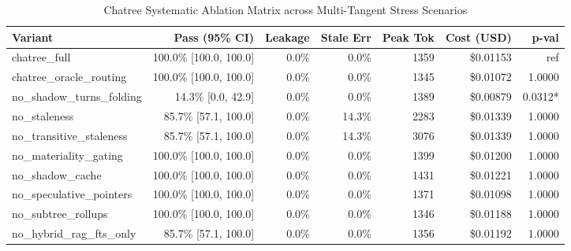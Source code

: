 \begin{table}[t]
\centering
\small
\begin{tabular}{lrrrrrr}
\toprule
\textbf{Variant} & \textbf{Pass (95\% CI)} & \textbf{Leakage} & \textbf{Stale Err} & \textbf{Peak Tok} & \textbf{Cost (USD)} & \textbf{p-val} \\
\midrule
chatree\_full & 100.0\% [100.0, 100.0] & 0.0\% & 0.0\% & 1359 & \$0.01153 & ref \\
chatree\_oracle\_routing & 100.0\% [100.0, 100.0] & 0.0\% & 0.0\% & 1345 & \$0.01072 & 1.0000 \\
no\_shadow\_turns\_folding & 14.3\% [0.0, 42.9] & 0.0\% & 0.0\% & 1389 & \$0.00879 & 0.0312* \\
no\_staleness & 85.7\% [57.1, 100.0] & 0.0\% & 14.3\% & 2283 & \$0.01339 & 1.0000 \\
no\_transitive\_staleness & 85.7\% [57.1, 100.0] & 0.0\% & 14.3\% & 3076 & \$0.01339 & 1.0000 \\
no\_materiality\_gating & 100.0\% [100.0, 100.0] & 0.0\% & 0.0\% & 1399 & \$0.01200 & 1.0000 \\
no\_shadow\_cache & 100.0\% [100.0, 100.0] & 0.0\% & 0.0\% & 1431 & \$0.01221 & 1.0000 \\
no\_speculative\_pointers & 100.0\% [100.0, 100.0] & 0.0\% & 0.0\% & 1371 & \$0.01098 & 1.0000 \\
no\_subtree\_rollups & 100.0\% [100.0, 100.0] & 0.0\% & 0.0\% & 1346 & \$0.01188 & 1.0000 \\
no\_hybrid\_rag\_fts\_only & 85.7\% [57.1, 100.0] & 0.0\% & 0.0\% & 1356 & \$0.01192 & 1.0000 \\
\bottomrule
\end{tabular}
\caption{Chatree Systematic Ablation Matrix across Multi-Tangent Stress Scenarios}
\label{tab:chatree-ablations}
\end{table}
